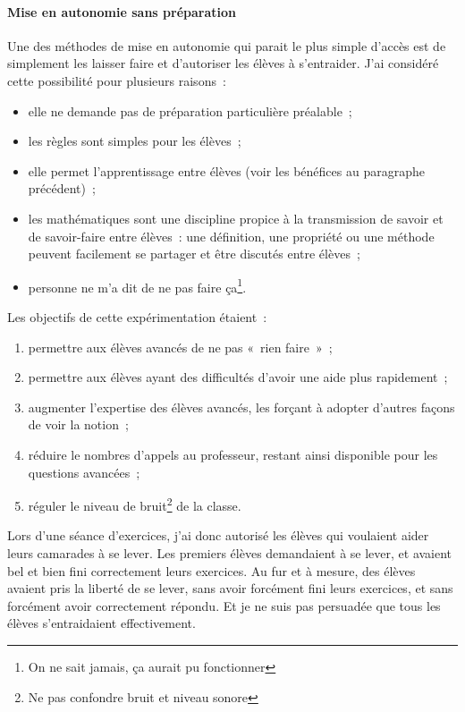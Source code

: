 \paragraph{Mise en autonomie sans préparation}

Une des méthodes de mise en autonomie qui parait le plus simple d'accès est de
simplement les laisser faire et d'autoriser les élèves à s'entraider. J'ai
considéré cette possibilité pour plusieurs raisons :
\begin{itemize}
    \item elle ne demande pas de préparation particulière préalable ;
    \item les règles sont simples pour les élèves ;
    \item elle permet l'apprentissage entre élèves (voir les bénéfices au paragraphe précédent) ;
    \item les mathématiques sont une discipline propice à la transmission de savoir et de savoir-faire entre élèves : une définition, une propriété ou une méthode peuvent facilement
    se partager et être discutés entre élèves ;
    \item personne ne m'a dit de ne pas faire ça\footnote{On ne sait jamais, ça aurait pu fonctionner}.
\end{itemize}

Les objectifs de cette expérimentation étaient :
\begin{enumerate}
    \item permettre aux élèves avancés de ne pas « rien faire » ;
    \item permettre aux élèves ayant des difficultés d'avoir une aide plus
    rapidement ;
    \item augmenter l'expertise des élèves avancés, les forçant à adopter d'autres
    façons de voir la notion ;
    \item réduire le nombres d'appels au professeur, restant ainsi disponible
    pour les questions avancées ;
    \item réguler le niveau de bruit\footnote{Ne pas confondre bruit et niveau sonore} de la classe.
\end{enumerate}

Lors d'une séance d'exercices, j'ai donc autorisé les élèves qui voulaient
aider leurs camarades à se lever. Les premiers élèves demandaient à se lever, et
avaient bel et bien fini correctement leurs exercices. Au fur et à mesure, des
élèves avaient pris la liberté de se lever, sans avoir forcément fini leurs exercices,
et sans forcément avoir correctement répondu. Et je ne suis pas persuadée que
tous les élèves s'entraidaient effectivement.

